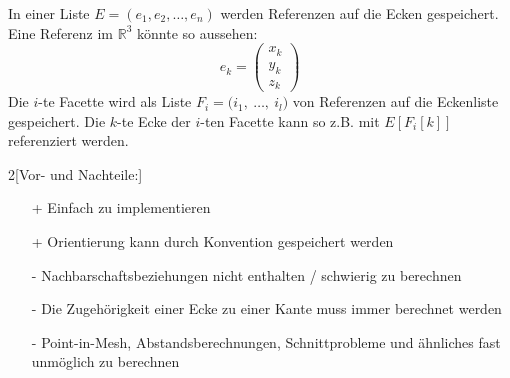 \begin{Definition}[Eckenliste]

In einer Liste $E = (e_1, e_2, \hdots, e_n)$ werden Referenzen auf die Ecken 
gespeichert. 
Eine Referenz im $\mathbb{R}^3$ könnte so aussehen: 
\begin{equation*}
    e_k = \begin{pmatrix}
        x_k \\
        y_k \\
        z_k
    \end{pmatrix}
\end{equation*}
Die $i$-te Facette wird als Liste $F_i = \bigl( i_1,~\hdots,~i_l  \bigr)$ von 
Referenzen auf die Eckenliste gespeichert. 
Die $k$-te Ecke der $i$-ten Facette kann so z.B. mit $E[F_i[k]]$ referenziert 
werden. 
\end{Definition}
\begin{multicols}{2}[Vor- und Nachteile:]
    \begin{itemize}
        \item[+] Einfach zu implementieren
        \item[+] Orientierung kann durch Konvention gespeichert werden
        \vspace{60pt}
        \item[-] Nachbarschaftsbeziehungen nicht enthalten / schwierig zu 
                 berechnen
        \item[-] Die Zugehörigkeit einer Ecke zu einer Kante muss immer 
                 berechnet werden
        \item[-] Point-in-Mesh, Abstandsberechnungen,  Schnittprobleme und ähnliches fast unmöglich zu berechnen
    \end{itemize}
\end{multicols}


